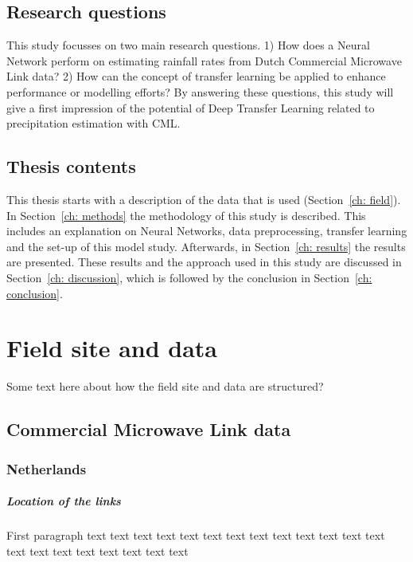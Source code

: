 \documentclass[twocolumn, 10pt, a4paper]{memoir}
\begin{document}
\section{Research questions}
This study focusses on two main research questions.
1) How does a Neural Network perform on estimating rainfall rates from Dutch Commercial Microwave Link data?
2) How can the concept of transfer learning be applied to enhance performance or modelling efforts?
By answering these questions, this study will give a first impression of the potential of Deep Transfer Learning related to precipitation estimation with CML. 


\section{Thesis contents}
This thesis starts with a description of the data that is used (Section~\ref{ch: field}). In Section~\ref{ch: methods} the methodology of this study is described. This includes an explanation on Neural Networks, data preprocessing, transfer learning and the set-up of this model study. Afterwards, in Section~\ref{ch: results} the results are presented. These results and the approach used in this study are discussed in Section~\ref{ch: discussion}, which is followed by the conclusion in Section~\ref{ch: conclusion}.







\cleardoublepage
\chapter{Field site and data}\vspace{-6mm} 
\label{ch: field}
Some text here about how the field site and data are structured?

\section{Commercial Microwave Link data}
	\subsection{Netherlands}
		\paragraph{Location of the links}
		First paragraph 
		text text text text text text text text text text text text text text text text text text text text text
\end{document}
